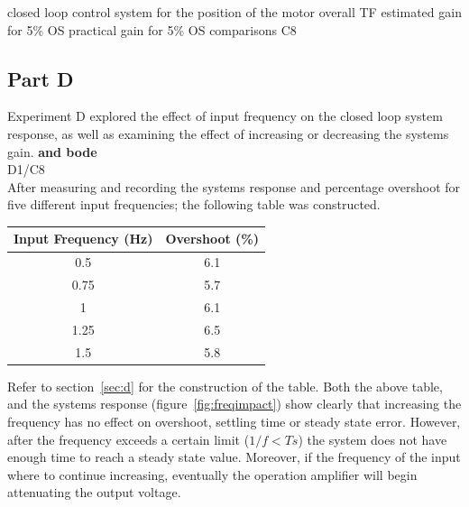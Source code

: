 \documentclass[11pt,a4paper]{article}
\begin{document}
closed loop control system for the position of the motor
overall TF
estimated gain for 5\% OS
practical gain for 5\% OS
comparisons
C8








\pagebreak
\subsection{Part D}
Experiment D explored the effect of input frequency on the closed loop system response, as well as examining the effect of increasing or decreasing the systems gain. \textbf{and bode}\\
  
D1/C8 \\

After measuring and recording the systems response and percentage overshoot for five different input frequencies; the following table was constructed. 

\begin{center}
    \begin{tabular}{| c | c |}
    \hline
    Input Frequency (Hz)  & Overshoot (\%)  \\ \hline
    0.5  	                  & 6.1  		\\ \hline
	0.75  	                  & 5.7  		\\ \hline
	1		                  & 6.1 		\\ \hline
	1.25	                  & 6.5 		\\ \hline
	1.5		                  & 5.8 		\\
    \hline
    \end{tabular}
\end{center}
 
Refer to section~\ref{sec:d} for the construction of the table. Both the above table, and the systems response (figure~\ref{fig:freqimpact}) show clearly that increasing the frequency has no effect on overshoot, settling time or steady state error. However, after the frequency exceeds a certain limit (\textbf{$1/f < Ts$}) the system does not have enough time to reach a steady state value. Moreover, if the frequency of the input where to continue increasing, eventually the operation amplifier will begin attenuating the output voltage. 
\end{document}
